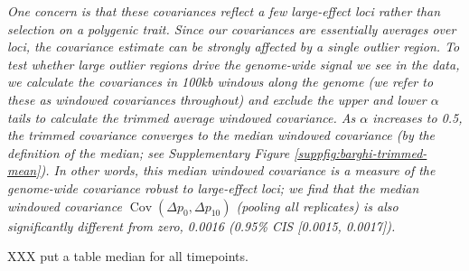 \documentclass[11pt]{article}
\newcommand{\vb}[1]{{\it \color{blue} #1}}
\DeclareMathOperator{\cov}{Cov}
\begin{document}
\vb{One concern is that these covariances reflect a few large-effect loci
  rather than selection on a polygenic trait. Since our covariances are
  essentially averages over loci, the covariance estimate can be strongly
  affected by a single outlier region. To test whether large outlier regions
  drive the genome-wide signal we see in the \textcite{Barghi2019-qy} data, we
  calculate the covariances in 100kb windows along the genome (we refer to
  these as windowed covariances throughout) and exclude the upper and lower
  $\alpha$ tails to calculate the trimmed average windowed covariance. As
  $\alpha$ increases to 0.5, the trimmed covariance converges to the median
  windowed covariance (by the definition of the median; see Supplementary
  Figure \ref{suppfig:barghi-trimmed-mean}). In other words, this median
  windowed covariance is a measure of the genome-wide covariance robust to
  large-effect loci; we find that the median windowed covariance $\cov(\Delta
  p_0, \Delta p_{10})$ (pooling all replicates) is also significantly different
  from zero, 0.0016 (0.95\% CIS [0.0015, 0.0017]). 

  XXX put a table median for all timepoints.
 }
\end{document}
